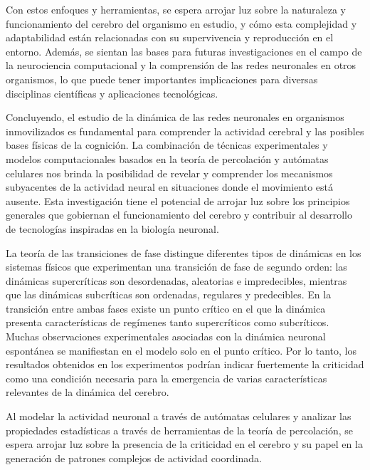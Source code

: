Con estos enfoques y herramientas, se espera arrojar luz sobre la naturaleza y funcionamiento del cerebro del organismo en estudio, y cómo esta complejidad y adaptabilidad están relacionadas con su supervivencia y reproducción en el entorno. Además, se sientan las bases para futuras investigaciones en el campo de la neurociencia computacional y la comprensión de las redes neuronales en otros organismos, lo que puede tener importantes implicaciones para diversas disciplinas científicas y aplicaciones tecnológicas.

Concluyendo, el estudio de la dinámica de las redes neuronales en organismos inmovilizados es fundamental para comprender la actividad cerebral y las posibles bases físicas de la cognición. La combinación de técnicas experimentales y modelos computacionales basados en la teoría de percolación y autómatas celulares nos brinda la posibilidad de revelar y comprender los mecanismos subyacentes de la actividad neural en situaciones donde el movimiento está ausente. Esta investigación tiene el potencial de arrojar luz sobre los principios generales que gobiernan el funcionamiento del cerebro y contribuir al desarrollo de tecnologías inspiradas en la biología neuronal.

La teoría de las transiciones de fase distingue diferentes tipos de dinámicas en los sistemas físicos que experimentan una transición de fase de segundo orden: las dinámicas supercríticas son desordenadas, aleatorias e impredecibles, mientras que las dinámicas subcríticas son ordenadas, regulares y predecibles. En la transición entre ambas fases existe un punto crítico en el que la dinámica presenta características de regímenes tanto supercríticos como subcríticos. Muchas observaciones experimentales asociadas con la dinámica neuronal espontánea se manifiestan en el modelo solo en el punto crítico. Por lo tanto, los resultados obtenidos en los experimentos podrían indicar fuertemente la criticidad como una condición necesaria para la emergencia de varias características relevantes de la dinámica del cerebro.

Al modelar la actividad neuronal a través de autómatas celulares y analizar las propiedades estadísticas a través de herramientas de la teoría de percolación, se espera arrojar luz sobre la presencia de la criticidad en el cerebro y su papel en la generación de patrones complejos de actividad coordinada.
